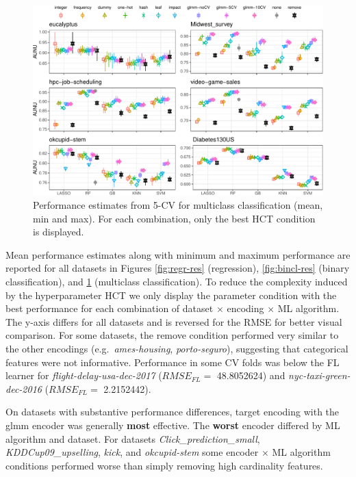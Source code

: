 \documentclass[smallextended]{svjour3}       %
\begin{document}
\begin{figure}[!h]
\includegraphics[width=\textwidth]{multcl-res-1} \caption{Performance estimates from 5-CV for multiclass classification (mean, min and max). For each combination, only the best HCT condition is displayed.}\label{fig:multcl-res}
\end{figure}

Mean performance estimates along with minimum and maximum performance are reported for all datasets in Figures \ref{fig:regr-res} (regression), \ref{fig:bincl-res} (binary classification), and \ref{fig:multcl-res} (multiclass classification).
To reduce the complexity induced by the hyperparameter HCT we only display the parameter condition with the best performance for each combination of dataset \(\times\) encoding \(\times\) ML algorithm.
The y-axis differs for all datasets and is reversed for the RMSE for better visual comparison.
For some datasets, the remove condition performed very similar to the other encodings (e.g.~\emph{ames-housing}, \emph{porto-seguro}), suggesting that categorical features were not informative.
Performance in some CV folds was below the FL learner for \emph{flight-delay-usa-dec-2017} (\(RMSE_{FL} =\) 48.8052624) and \emph{nyc-taxi-green-dec-2016} (\(RMSE_{FL} =\) 2.2152442).

On datasets with substantive performance differences, target encoding with the glmm encoder was generally \textbf{most} effective.
The \textbf{worst} encoder differed by ML algorithm and dataset.
For datasets \emph{Click\_prediction\_small}, \emph{KDDCup09\_upselling}, \emph{kick}, and \emph{okcupid-stem} some encoder \(\times\) ML algorithm conditions performed worse than simply removing high cardinality features.
\end{document}
